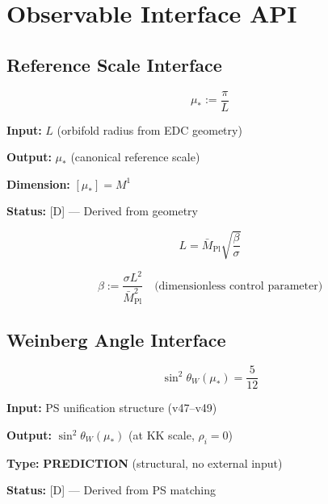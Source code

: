 \documentclass[11pt,a4paper]{article}
\theoremstyle{definition}
\begin{document}
\section{Observable Interface API}
\label{sec:interface}

\subsection{Reference Scale Interface}
\label{subsec:scale_interface}

\begin{apibox}
\begin{equation}
\label{eq:api_mu_star}
\boxed{\mu_* := \frac{\pi}{L}}
\end{equation}

\textbf{Input:} $L$ (orbifold radius from EDC geometry)

\textbf{Output:} $\mu_*$ (canonical reference scale)

\textbf{Dimension:} $[\mu_*] = M^1$

\textbf{Status:} [D] --- Derived from geometry
\end{apibox}

\begin{equation}
\label{eq:L_from_EDC}
L = \bar{M}_{\text{Pl}}\sqrt{\frac{\beta}{\sigma}}
\end{equation}

\begin{equation}
\label{eq:beta_def}
\beta := \frac{\sigma L^2}{\bar{M}_{\text{Pl}}^2} \quad \text{(dimensionless control parameter)}
\end{equation}

\subsection{Weinberg Angle Interface}
\label{subsec:sw2_interface}

\begin{apibox}
\begin{equation}
\label{eq:api_sw2_star}
\boxed{\sin^2\theta_W(\mu_*) = \frac{5}{12}}
\end{equation}

\textbf{Input:} PS unification structure (v47--v49)

\textbf{Output:} $\sin^2\theta_W(\mu_*)$ (at KK scale, $\rho_i = 0$)

\textbf{Type:} \textbf{PREDICTION} (structural, no external input)

\textbf{Status:} [D] --- Derived from PS matching
\end{apibox}
\end{document}
